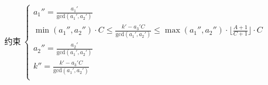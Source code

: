 \documentclass[preview]{standalone}
\begin{document}
\begin{align*}
\text{约束}~\begin{cases}a_1'' = \frac{a_1'}{\mathrm{gcd}(a_1', a_2')} \\\min (a_1'', a_2'') \cdot C \leq \frac{k' - a_3' C}{\mathrm{gcd}(a_1', a_2')} \leq \max (a_1'', a_2'') \cdot \lfloor \frac{A + 1}{C + 1} \rfloor \cdot C \\a_2'' = \frac{a_2'}{\mathrm{gcd}(a_1', a_2')} \\k'' = \frac{k' - a_3' C}{\mathrm{gcd}(a_1', a_2')} \\\end{cases}
\end{align*}
\end{document}
